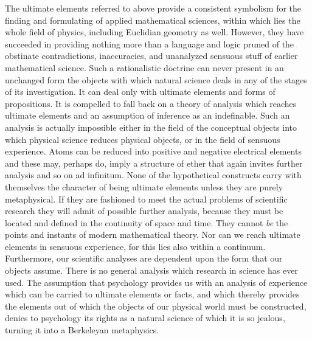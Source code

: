 \documentclass[12pt]{article}
\begin{document}
The ultimate elements referred to above provide a
consistent symbolism for the finding and formulating of
applied mathematical sciences, within which lies the whole
field of physics, including Euclidian geometry as well.
However, they have succeeded in providing nothing
more than a language and logic pruned of the obstinate
contradictions, inaccuracies, and unanalyzed sensuous
stuff of earlier mathematical science. Such a rationalistic
doctrine can never present in an unchanged form
the objects with which natural science deals in any of
the stages of its investigation. It can deal only with
ultimate elements and forms of propositions. It is
compelled to fall back on a theory of analysis
which reaches ultimate elements and an assumption of
inference as an indefinable. Such an analysis is actually
impossible either in the field of the conceptual objects
into which physical science reduces physical objects, or
in the field of sensuous experience. Atoms can be reduced
into positive and negative electrical elements and
these may, perhaps do, imply a structure of ether that
again invites further analysis and so on ad infinitum.
None of the hypothetical constructs carry with themselves
the character of being ultimate elements unless
they are purely metaphysical. If they are fashioned
to meet the actual problems of scientific research they
will admit of possible further analysis, because they
must be located and defined in the continuity of space
and time. They cannot \emph{be} the points and instants of
modern mathematical theory. Nor can we reach ultimate
elements in sensuous experience, for this lies
also within a continuum. Furthermore, our scientific
analyses are dependent upon the form that our objects
assume. There is no general analysis which research
in science has ever used. The assumption that psychology
provides us with an analysis of experience
which can be carried to ultimate elements or facts, and
which thereby provides the elements out of which the
objects of our physical world must be constructed,
denies to psychology its rights as a natural science of
which it is so jealous, turning it into a Berkeleyan
metaphysics.
\end{document}
